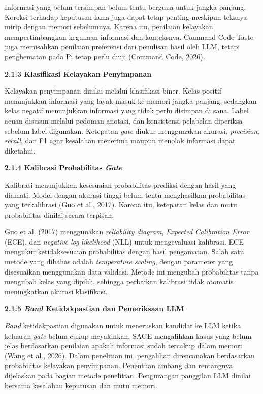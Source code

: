 \documentclass[12pt,a4paper]{article}
\newcommand{\asing}[1]{\textit{#1}}
\newcommand{\subsubbab}[2]{%
  \par\vspace{0.5em}\phantomsection\label{#2}%
  \noindent\textbf{#1}\par\nopagebreak\vspace{0.2em}}
\begin{document}
Informasi yang belum tersimpan belum tentu berguna untuk jangka panjang. Koreksi terhadap keputusan lama juga dapat tetap penting meskipun teksnya mirip dengan memori sebelumnya. Karena itu, penilaian kelayakan mempertimbangkan kegunaan informasi dan konteksnya. Command Code Taste juga memisahkan penilaian preferensi dari penulisan hasil oleh LLM, tetapi penghematan pada Pi tetap perlu diuji (Command Code, 2026).

\subsubbab{2.1.3 Klasifikasi Kelayakan Penyimpanan}{sec:2.1.3}

Kelayakan penyimpanan dinilai melalui klasifikasi biner. Kelas positif menunjukkan informasi yang layak masuk ke memori jangka panjang, sedangkan kelas negatif menunjukkan informasi yang tidak perlu disimpan di sana. Label acuan disusun melalui pedoman anotasi, dan konsistensi pelabelan diperiksa sebelum label digunakan. Ketepatan \asing{gate} diukur menggunakan akurasi, \asing{precision}, \asing{recall}, dan F1 agar kesalahan menerima maupun menolak informasi dapat diketahui.

\subsubbab{2.1.4 Kalibrasi Probabilitas \asing{Gate}}{sec:2.1.4}

Kalibrasi menunjukkan kesesuaian probabilitas prediksi dengan hasil yang diamati. Model dengan akurasi tinggi belum tentu menghasilkan probabilitas yang terkalibrasi (Guo et al., 2017). Karena itu, ketepatan kelas dan mutu probabilitas dinilai secara terpisah.

Guo et al. (2017) menggunakan \asing{reliability diagram}, \asing{Expected Calibration Error} (ECE), dan \asing{negative log-likelihood} (NLL) untuk mengevaluasi kalibrasi. ECE mengukur ketidaksesuaian probabilitas dengan hasil pengamatan. Salah satu metode yang dibahas adalah \asing{temperature scaling}, dengan parameter yang disesuaikan menggunakan data validasi. Metode ini mengubah probabilitas tanpa mengubah kelas yang dipilih, sehingga perbaikan kalibrasi tidak otomatis meningkatkan akurasi klasifikasi.

\subsubbab{2.1.5 \asing{Band} Ketidakpastian dan Pemeriksaan LLM}{sec:2.1.5}

\asing{Band} ketidakpastian digunakan untuk meneruskan kandidat ke LLM ketika keluaran \asing{gate} belum cukup meyakinkan. SAGE mengalihkan kasus yang belum jelas berdasarkan penilaian apakah informasi sudah tercakup dalam memori (Wang et al., 2026). Dalam penelitian ini, pengalihan direncanakan berdasarkan probabilitas kelayakan penyimpanan. Penentuan ambang dan rentangnya dijelaskan pada bagian metode penelitian. Pengurangan panggilan LLM dinilai bersama kesalahan keputusan dan mutu memori.
\end{document}
